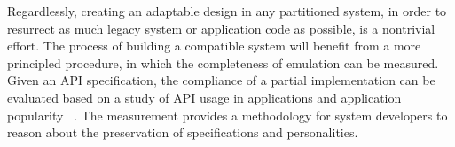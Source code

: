 

Regardlessly, creating an adaptable design
in any partitioned system,
in order to resurrect as much legacy system or application code as possible,
is a nontrivial effort.
The process of building a compatible system will benefit from a more principled procedure,
in which the completeness of emulation can be measured.
Given an API specification,
the compliance of a partial implementation can be evaluated
based on a study of API usage in applications and application popularity
~\citep{tsai16apistudy}.
The measurement provides a methodology
for system developers to reason about the
preservation of specifications and personalities.





